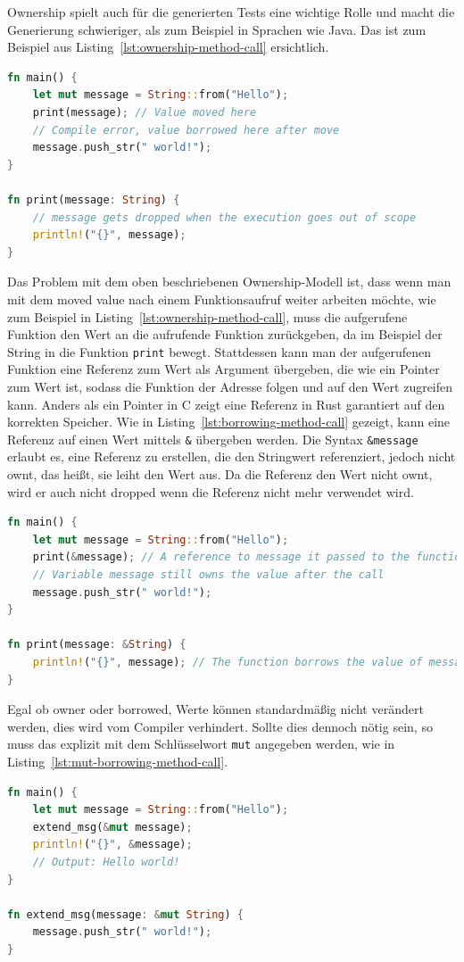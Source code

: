 \documentclass{article}
\begin{document}
Ownership spielt auch für die generierten Tests eine wichtige Rolle und macht die Generierung schwieriger, als zum Beispiel in Sprachen wie Java. Das ist zum Beispiel aus Listing~\ref{lst:ownership-method-call} ersichtlich.
\begin{lstlisting}[language=Rust, style=boxed, caption=Transferring the ownership to a method, label=lst:ownership-method-call]
fn main() {
    let mut message = String::from("Hello");
    print(message); // Value moved here
    // Compile error, value borrowed here after move
    message.push_str(" world!");
}

fn print(message: String) {
    // message gets dropped when the execution goes out of scope
    println!("{}", message);
}
\end{lstlisting}

Das Problem mit dem oben beschriebenen Ownership-Modell ist, dass wenn man mit dem moved value nach einem Funktionsaufruf weiter arbeiten möchte, wie zum Beispiel in Listing~\ref{lst:ownership-method-call}, muss die aufgerufene Funktion den Wert an die aufrufende Funktion zurückgeben, da im Beispiel der String in die Funktion \lstinline{print} bewegt. Stattdessen kann man der aufgerufenen Funktion eine Referenz zum Wert als Argument übergeben, die wie ein Pointer zum Wert ist, sodass die Funktion der Adresse folgen und auf den Wert zugreifen kann. Anders als ein Pointer in C zeigt eine Referenz in Rust garantiert auf den korrekten Speicher. Wie in Listing~\ref{lst:borrowing-method-call} gezeigt, kann eine Referenz auf einen Wert mittels \lstinline{&} übergeben werden. Die Syntax \lstinline{&message} erlaubt es, eine Referenz zu erstellen, die den Stringwert referenziert, jedoch nicht ownt, das heißt, sie leiht den Wert aus. Da die Referenz den Wert nicht ownt, wird er auch nicht dropped wenn die Referenz nicht mehr verwendet wird.

\begin{lstlisting}[language=Rust, style=boxed, caption=Transferring the ownership to a method, label=lst:borrowing-method-call]
fn main() {
    let mut message = String::from("Hello");
    print(&message); // A reference to message it passed to the function call
    // Variable message still owns the value after the call
    message.push_str(" world!");
}

fn print(message: &String) {
    println!("{}", message); // The function borrows the value of message
}
\end{lstlisting}

Egal ob owner oder borrowed, Werte können standardmäßig nicht verändert werden, dies wird vom Compiler verhindert. Sollte dies dennoch nötig sein, so muss das explizit mit dem Schlüsselwort \lstinline{mut} angegeben werden, wie in Listing~\ref{lst:mut-borrowing-method-call}.
\begin{lstlisting}[language=Rust, style=boxed, caption=Transferring the ownership to a method, label=lst:mut-borrowing-method-call]
fn main() {
    let mut message = String::from("Hello");
    extend_msg(&mut message);
    println!("{}", &message);
    // Output: Hello world!
}

fn extend_msg(message: &mut String) {
    message.push_str(" world!");
}
\end{lstlisting}
\end{document}
